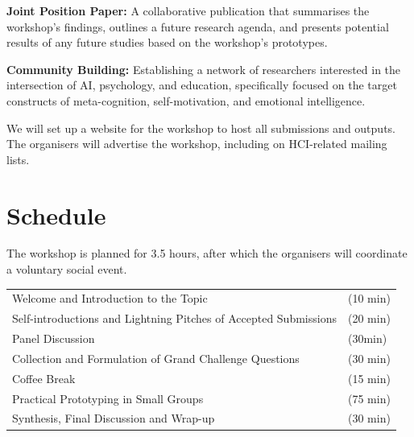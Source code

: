 \documentclass[manuscript,screen,review]{acmart}
\begin{document}
\noindent\textbf{Joint Position Paper:} A collaborative publication that summarises the workshop's findings, outlines a future research agenda, and presents potential results of any future studies based on the workshop's prototypes.

\noindent\textbf{Community Building:} Establishing a network of researchers interested in the intersection of AI, psychology, and education, specifically focused on the target constructs of meta-cognition, self-motivation, and emotional intelligence.

We will set up a website for the workshop to host all submissions and outputs. The organisers will advertise the workshop, including on HCI-related mailing lists.

\section{Schedule}

The workshop is planned for 3.5 hours, after which the organisers will coordinate a voluntary social event.



\noindent\small\begin{tabular}{ll}
    Welcome and Introduction to the Topic & (10 min) \\
    Self-introductions and Lightning Pitches of Accepted Submissions & (20 min)  \\
    Panel Discussion & (30min) \\
    Collection and Formulation of Grand Challenge Questions & (30 min) \\
    Coffee Break & (15 min) \\
    Practical Prototyping in Small Groups & (75 min) \\
    Synthesis, Final Discussion and Wrap-up & (30 min) \end{tabular}
\end{document}
